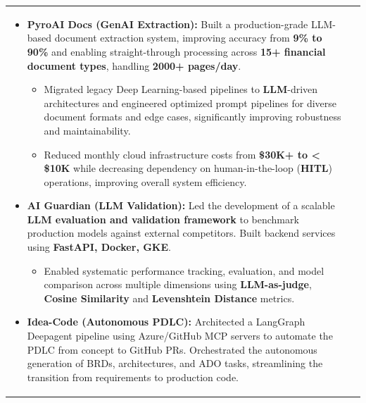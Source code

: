 \documentclass[a4paper,10pt]{article}
\begin{document}
\begin{tabularx}{\linewidth}{ @{}l r@{} }
\begin{minipage}[t]{\linewidth}
\begin{itemize}[nosep,after=\strut, leftmargin=2em, itemsep=2pt]
        \item \textbf{PyroAI Docs (GenAI Extraction):} Built a production-grade LLM-based document extraction system, improving accuracy from \textbf{9\% to 90\%} and enabling straight-through processing across \textbf{15+ financial document types}, handling \textbf{2000+ pages/day}.
            \begin{itemize}
                \item Migrated legacy Deep Learning-based pipelines to \textbf{LLM}-driven architectures and engineered optimized prompt pipelines for diverse document formats and edge cases, significantly improving robustness and maintainability.
                \item Reduced monthly cloud infrastructure costs from \textbf{\$30K+ to < \$10K} while decreasing dependency on human-in-the-loop (\textbf{HITL}) operations, improving overall system efficiency.
            \end{itemize}
    
        \item \textbf{AI Guardian (LLM Validation):} Led the development of a scalable \textbf{LLM evaluation and validation framework} to benchmark production models against external competitors. Built backend services using \textbf{FastAPI, Docker, GKE}.
            \begin{itemize}
                \item Enabled systematic performance tracking, evaluation, and model comparison across multiple dimensions using \textbf{LLM-as-judge}, \textbf{Cosine Similarity} and \textbf{Levenshtein Distance} metrics.
            \end{itemize}
        
        \item \textbf{Idea-Code (Autonomous PDLC):} Architected a LangGraph Deepagent pipeline using Azure/GitHub MCP servers to automate the PDLC from concept to GitHub PRs. Orchestrated the autonomous generation of BRDs, architectures, and ADO tasks, streamlining the transition from requirements to production code.
        
    \end{itemize}
    \end{minipage}
    \end{tabularx}
    
\end{document}
